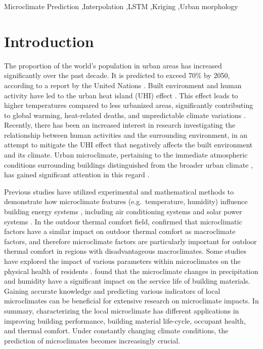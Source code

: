 \documentclass[a4paper,fleqn]{cas-sc}
\begin{document}
\begin{keywords}
Microclimate Prediction  \sep Interpolation  \sep LSTM \sep Kriging \sep Urban morphology 
\end{keywords}


\maketitle

\section{Introduction}\label{Introduction}

The proportion of the world's population in urban areas has increased significantly over the past decade. It is predicted to exceed 70\% by 2050, according to a report by the United Nations \citep{nations2019world}. Built environment and human activity have led to the urban heat island (UHI) effect \citep{arnfield2003two, akbari2016local,chakraborty2021reduction}. This effect leads to higher temperatures compared to less urbanized areas, significantly contributing to global warming, heat-related deaths, and unpredictable climate variations \citep{deilami2018urban}. Recently, there has been an increased interest in research investigating the relationship between human activities and the surrounding environment, in an attempt to mitigate the UHI effect that negatively affects the built environment and its climate. Urban microclimate, pertaining to the immediate atmospheric conditions surrounding buildings distinguished from the broader urban climate \citep{wang2021benchmarking}, has gained significant attention in this regard \citep{yang2023urban}.

Previous studies have utilized experimental and mathematical methods to demonstrate how microclimate features (e.g.\ temperature, humidity) influence building energy systems \citep{bijarniya2020environmental, im2022impact}, including air conditioning systems and solar power systems \citep{bevilacqua2020seasonal,wu2022revealing}. In the outdoor thermal comfort field, \citet{zhang2022assessment} confirmed that microclimatic factors have a similar impact on outdoor thermal comfort as macroclimate factors, and therefore microclimate factors are particularly important for outdoor thermal comfort in regions with disadvantageous macroclimates. Some studies have explored the impact of various parameters within microclimates on the physical health of residents \citep{wu2020impact,heidari2020effects}. \citet{hayles2022quantifying} found that the microclimate changes in precipitation and humidity have a significant impact on the service life of building materials. Gaining accurate knowledge and predicting various indicators of local microclimates can be beneficial for extensive research on microclimate impacts. In summary, characterizing the local microclimate has different applications in improving building performance, building material life-cycle, occupant health, and thermal comfort. Under constantly changing climate conditions, the prediction of microclimates becomes increasingly crucial.
\end{document}

